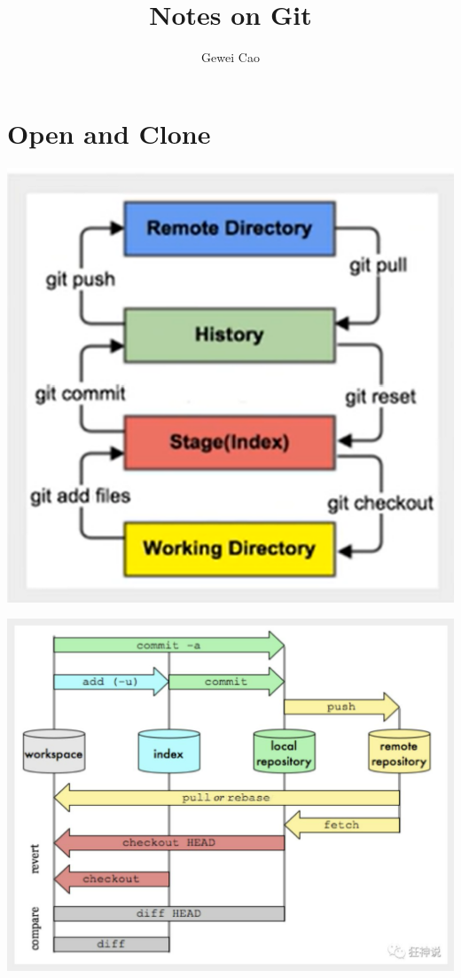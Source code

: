 \documentclass[UTF8]{article}
\title{Notes on Git}
\author{Gewei Cao}
\begin{document}
\maketitle
\section{Open and Clone}
\begin{center}
\includegraphics{gitfigure}
\end{center}

\begin{center}
\includegraphics[scale=0.6]{666}
\end{center}
\end{document}
